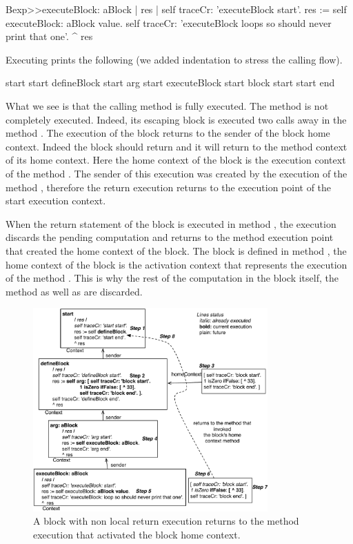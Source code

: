 \documentclass[a4paper,10pt,twoside]{book}
\begin{document}
\begin{code}{}
Bexp>>executeBlock: aBlock
	| res |
	self traceCr: 'executeBlock start'.
	res := self executeBlock: aBlock value.
	self traceCr: 'executeBlock loops so should never print that one'.
	^  res
\end{code}


Executing   prints the following (we added indentation to stress the calling flow).

\begin{code}{}
start start
   defineBlock start
      arg start
         executeBlock start
            block start
start end
\end{code}

What we see is that the calling method  is fully executed. The method  is not completely executed. Indeed, its escaping block \ct{[^33]} is executed two calls away in the method . The execution of the block returns to the sender of the block home context.
Indeed the block should return and it will return to the method context of its home context. Here the home context of the block is the execution context of the method . The sender of this execution was created by the execution of the method , therefore the return execution returns to the execution point of the start execution context.

When the return statement of the block is executed in method , the execution discards the pending computation and returns to the method execution point that created the home context of the block. The block is defined in  method , the home context of the block is the activation context that represents the execution of the method . This is why the rest of the computation in the block itself, the  method as well as  are discarded.

\begin{figure}[!h]
\begin{center}\includegraphics[width=9cm]{nonLocalReturn2}
\caption{A block with non local return execution returns to the method execution that activated the block home context.\label{nonLocalReturn}}
\end{center}
\end{figure}
\end{document}
